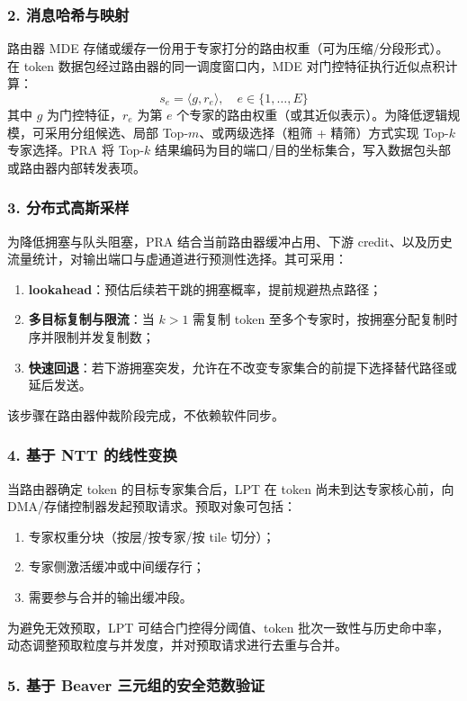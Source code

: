 \documentclass[12pt,a4paper]{article}
\begin{document}
\subsubsection{2. 消息哈希与映射}

路由器 MDE 存储或缓存一份用于专家打分的路由权重（可为压缩/分段形式）。在 token 数据包经过路由器的同一调度窗口内，MDE 对门控特征执行近似点积计算：
\[
s_e = \langle g, r_e \rangle,\quad e \in \{1,\dots,E\}
\]
其中 $g$ 为门控特征，$r_e$ 为第 $e$ 个专家的路由权重（或其近似表示）。为降低逻辑规模，可采用分组候选、局部 Top-$m$、或两级选择（粗筛 + 精筛）方式实现 Top-$k$ 专家选择。PRA 将 Top-$k$ 结果编码为目的端口/目的坐标集合，写入数据包头部或路由器内部转发表项。

\subsubsection{3. 分布式高斯采样}

为降低拥塞与队头阻塞，PRA 结合当前路由器缓冲占用、下游 credit、以及历史流量统计，对输出端口与虚通道进行预测性选择。其可采用：
\begin{enumerate}
    \item \textbf{lookahead}：预估后续若干跳的拥塞概率，提前规避热点路径；
    \item \textbf{多目标复制与限流}：当 $k>1$ 需复制 token 至多个专家时，按拥塞分配复制时序并限制并发复制数；
    \item \textbf{快速回退}：若下游拥塞突发，允许在不改变专家集合的前提下选择替代路径或延后发送。
\end{enumerate}
该步骤在路由器仲裁阶段完成，不依赖软件同步。

\subsubsection{4. 基于 NTT 的线性变换}

当路由器确定 token 的目标专家集合后，LPT 在 token 尚未到达专家核心前，向 DMA/存储控制器发起预取请求。预取对象可包括：
\begin{enumerate}
    \item 专家权重分块（按层/按专家/按 tile 切分）；
    \item 专家侧激活缓冲或中间缓存行；
    \item 需要参与合并的输出缓冲段。
\end{enumerate}
为避免无效预取，LPT 可结合门控得分阈值、token 批次一致性与历史命中率，动态调整预取粒度与并发度，并对预取请求进行去重与合并。

\subsubsection{5. 基于 Beaver 三元组的安全范数验证}
\end{document}
